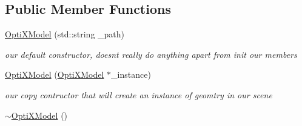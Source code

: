 \subsection*{Public Member Functions}
\begin{DoxyCompactItemize}
\item 
\hyperlink{class_opti_x_model_a38269b05e4286011e3a83b2abe3b25b6}{Opti\-X\-Model} (std\-::string \-\_\-path)
\begin{DoxyCompactList}\small\item\em our default constructor, doesnt really do anything apart from init our members \end{DoxyCompactList}\item 
\hyperlink{class_opti_x_model_ae090cf6bb20600227351b98c9248c56a}{Opti\-X\-Model} (\hyperlink{class_opti_x_model}{Opti\-X\-Model} $\ast$\-\_\-instance)
\begin{DoxyCompactList}\small\item\em our copy contructor that will create an instance of geomtry in our scene \end{DoxyCompactList}\item 
\hypertarget{class_opti_x_model_a64c0fd3c8459b81aa44ade1cf9d0a90b}{\hyperlink{class_opti_x_model_a64c0fd3c8459b81aa44ade1cf9d0a90b}{$\sim$\-Opti\-X\-Model} ()}\label{class_opti_x_model_a64c0fd3c8459b81aa44ade1cf9d0a90b}


\end{DoxyCompactItemize}
